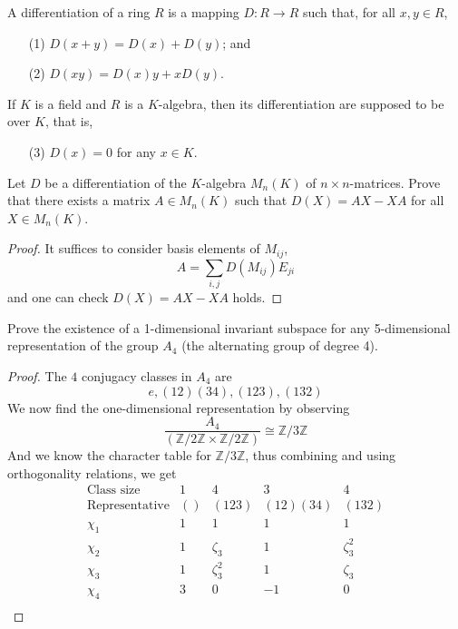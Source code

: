 \documentclass[openany]{book}
\newcommand{\Z}{\mathbb{Z}}
\begin{document}
\begin{prob}
    A differentiation of a ring \(R\) is a mapping \(D : R \to R\) such that, for all \(x,y \in R\),
    \begin{itemize}
        \item[(1)] \(D(x+y) = D(x) + D(y)\); and
        \item[(2)] \(D(xy) = D(x)y + xD(y)\).
    \end{itemize}
    If \(K\) is a field and \(R\) is a \(K\)-algebra, then its differentiation are supposed to be over \(K\), that is,
    \begin{itemize}
        \item[(3)] \(D(x) = 0\) for any \(x \in K\).
    \end{itemize}
    Let \(D\) be a differentiation of the \(K\)-algebra \(M_n(K)\) of \(n \times n\)-matrices. Prove that there exists a matrix \(A \in M_n(K)\) such that \(D(X) = AX - XA\) for all \(X \in M_n(K)\).
\end{prob}
\begin{proof}
    It suffices to consider basis elements of $M_{ij}$, 
    \begin{equation*}
        A=\sum_{i,j}D(M_{ij})E_{ji}
    \end{equation*}
    and one can check \(D(X) = AX - XA\) holds.
\end{proof}





\begin{prob}
    Prove the existence of a 1-dimensional invariant subspace for any 5-dimensional representation of the group \(A_4\) (the alternating group of degree 4).
\end{prob}
\begin{proof}
    The $4$ conjugacy classes in $A_4$ are 
    \begin{equation*}
        e, (12)(34), (123), (132)
    \end{equation*} 
    We now find the one-dimensional representation by observing 
    \begin{equation*}
        \frac{A_4}{(\Z/2\Z\times\Z/2\Z)}\cong\Z/3\Z
    \end{equation*}
    And we know the character table for $\Z/3\Z$, thus combining and using orthogonality relations, we get 
    \begin{equation*}
        \begin{array}{c|cccc}
            \text{Class size} & 1 & 4 & 3 & 4 \\
            \text{Representative} & () & (123) & (12)(34) & (132) \\
            \hline
            \chi_1 & 1 & 1 & 1 & 1 \\
            \chi_2 & 1 & \zeta_3 & 1 & \zeta_3^2 \\
            \chi_3 & 1 & \zeta_3^2 & 1 & \zeta_3 \\
            \chi_4 & 3 & 0 & -1 & 0 \\
            \end{array}
    \end{equation*}

\end{proof}
\end{document}
